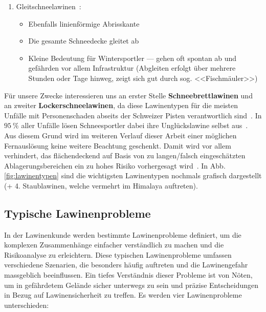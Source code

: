 \begin{enumerate}
  \item Gleitschneelawinen~\cite{harveyrhynerschweizerlawinenkunde}\cite{sacbergspwinter}\cite{slfLawinentypen}:
  \begin{itemize}
    \item Ebenfalls linienförmige Abrisskante
    \item Die gesamte Schneedecke gleitet ab
    \item Kleine Bedeutung für Wintersportler –-- gehen oft spontan ab und gefährden vor allem Infrastruktur (Abgleiten erfolgt über mehrere Stunden oder Tage hinweg, zeigt sich gut durch sog. <<Fischmäuler>>)
  \end{itemize}
\end{enumerate}
Für unsere Zwecke interessieren uns an erster Stelle \textbf{Schneebrettlawinen} und an zweiter \textbf{Lockerschneelawinen}, da diese Lawinentypen für die meisten Unfälle mit Personenschaden abseits der Schweizer Pisten verantwortlich sind~\cite{harveyrhynerschweizerlawinenkunde}. In $\qty{95}{\percent}$ aller Unfälle lösen Schneesportler dabei ihre Unglückslawine selbst aus~\cite{ortovoxlabsnow}. Aus diesem Grund wird im weiteren Verlauf dieser Arbeit einer möglichen Fernauslösung keine weitere Beachtung geschenkt. Damit wird vor allem verhindert, das flächendeckend auf Basis von zu langen/falsch eingeschätzten Ablagerungsbereichen ein zu hohes Risiko vorhergesagt wird~\cite{athmaps}. In Abb. \ref{fig:lawinentypen} sind die wichtigsten Lawinentypen nochmals grafisch dargestellt (+ 4. Staublawinen, welche vermehrt im Himalaya auftreten).

\pagebreak
\subsection{Typische Lawinenprobleme}\label{lawinenprobleme}

In der Lawinenkunde werden bestimmte Lawinenprobleme definiert, um die komplexen Zusammenhänge einfacher verständlich zu machen und die Risikoanalyse zu erleichtern. Diese typischen Lawinenprobleme umfassen verschiedene Szenarien, die besonders häufig auftreten und die Lawinengefahr massgeblich beeinflussen. Ein tiefes Verständnis dieser Probleme ist von Nöten, um in gefährdetem Gelände sicher unterwegs zu sein und präzise Entscheidungen in Bezug auf Lawinensicherheit zu treffen. Es werden vier Lawinenprobleme unterschieden:

